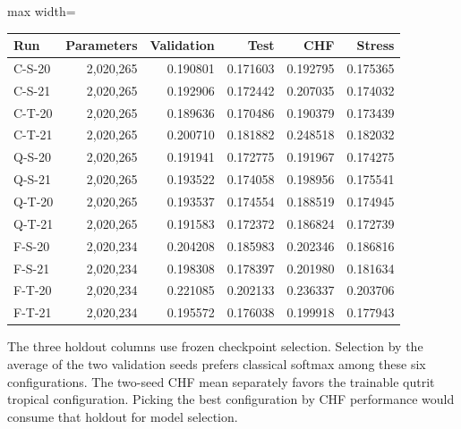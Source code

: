 \documentclass[11pt,oneside,openany]{book}
\begin{document}
\begin{center}\footnotesize\sffamily\setlength{\tabcolsep}{3.5pt}\renewcommand{\arraystretch}{1.2}
\begin{adjustbox}{max width=\linewidth}\begin{tabular}{@{}lrrrrr@{}}\toprule
Run & Parameters & Validation & Test & CHF & Stress \\ \midrule
C-S-20 & 2,020,265 & 0.190801 & 0.171603 & 0.192795 & 0.175365 \\
C-S-21 & 2,020,265 & 0.192906 & 0.172442 & 0.207035 & 0.174032 \\
C-T-20 & 2,020,265 & 0.189636 & 0.170486 & 0.190379 & 0.173439 \\
C-T-21 & 2,020,265 & 0.200710 & 0.181882 & 0.248518 & 0.182032 \\
Q-S-20 & 2,020,265 & 0.191941 & 0.172775 & 0.191967 & 0.174275 \\
Q-S-21 & 2,020,265 & 0.193522 & 0.174058 & 0.198956 & 0.175541 \\
Q-T-20 & 2,020,265 & 0.193537 & 0.174554 & 0.188519 & 0.174945 \\
Q-T-21 & 2,020,265 & 0.191583 & 0.172372 & 0.186824 & 0.172739 \\
F-S-20 & 2,020,234 & 0.204208 & 0.185983 & 0.202346 & 0.186816 \\
F-S-21 & 2,020,234 & 0.198308 & 0.178397 & 0.201980 & 0.181634 \\
F-T-20 & 2,020,234 & 0.221085 & 0.202133 & 0.236337 & 0.203706 \\
F-T-21 & 2,020,234 & 0.195572 & 0.176038 & 0.199918 & 0.177943 \\
\bottomrule\end{tabular}\end{adjustbox}\end{center}
The three holdout columns use frozen checkpoint selection. Selection by the average of the two validation seeds prefers classical softmax among these six configurations. The two-seed CHF mean separately favors the trainable qutrit tropical configuration. Picking the best configuration by CHF performance would consume that holdout for model selection.
\end{document}
